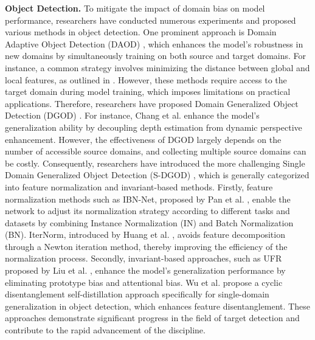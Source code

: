 \textbf{Object Detection.} 
To mitigate the impact of domain bias on model performance, researchers have conducted numerous experiments and proposed various methods in object detection. One prominent approach is Domain Adaptive Object Detection (DAOD) \cite{chen2021i3net,deng2021unbiased,krishna2023mila,li2022cross,oza2023unsupervised,zhao2020review}, which enhances the model's robustness in new domains by simultaneously training on both source and target domains. For instance, a common strategy involves minimizing the distance between global and local features, as outlined in \cite{cao2023contrastive,chen2020harmonizing,deng2021unbiased,saito2019strong}. However, these methods require access to the target domain during model training, which imposes limitations on practical applications. Therefore, researchers have proposed Domain Generalized Object Detection (DGOD) \cite{chang2024unified,qin2024towards}. For instance, Chang et al. \cite{chang2024unified} enhance the model's generalization ability by decoupling depth estimation from dynamic perspective enhancement. However, the effectiveness of DGOD largely depends on the number of accessible source domains, and collecting multiple source domains can be costly. Consequently, researchers have introduced the more challenging Single Domain Generalized Object Detection (S-DGOD) \cite{vidit2023clip,danish2024improving,lee2024object,pan2018two,choi2021robustnet}, which is generally categorized into feature normalization and invariant-based methods. Firstly, feature normalization methods such as IBN-Net, proposed by Pan et al. \cite{pan2018two}, enable the network to adjust its normalization strategy according to different tasks and datasets by combining Instance Normalization (IN) and Batch Normalization (BN). IterNorm, introduced by Huang et al. \cite{huang2019iterative}, avoids feature decomposition through a Newton iteration method, thereby improving the efficiency of the normalization process. Secondly, invariant-based approaches, such as UFR proposed by Liu et al. \cite{liu2024unbiased}, enhance the model's generalization performance by eliminating prototype bias and attentional bias. Wu et al. \cite{wu2022single} propose a cyclic disentanglement self-distillation approach specifically for single-domain generalization in object detection, which enhances feature disentanglement. These approaches demonstrate significant progress in the field of target detection and contribute to the rapid advancement of the discipline.

